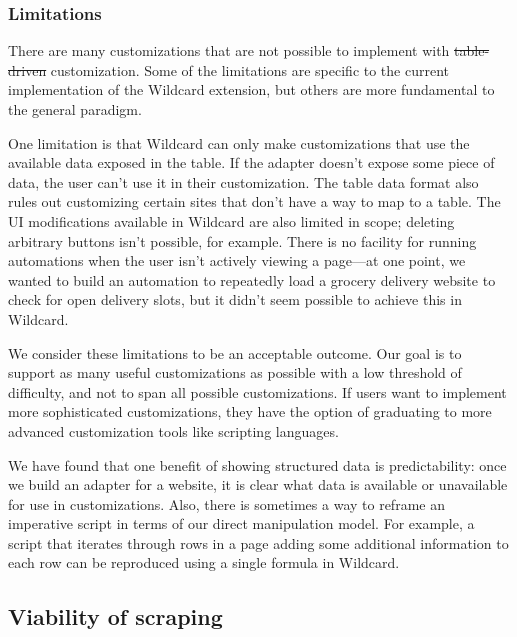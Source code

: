 \documentclass[sigplan,screen,10pt,anonymous,review]{acmart}
\providecommand{\DIFadd}[1]{{\protect\color{blue}\uwave{#1}}} %
\providecommand{\DIFdel}[1]{{\protect\color{red}\sout{#1}}}                      %
\providecommand{\DIFaddbegin}{} %
\providecommand{\DIFaddend}{} %
\providecommand{\DIFdelbegin}{} %
\providecommand{\DIFdelend}{} %
\begin{document}
\hypertarget{limitations}{%
\subsubsection{Limitations}\label{limitations}}

There are many customizations that are not possible to implement with
\DIFdelbegin \DIFdel{table-driven }\DIFdelend \DIFaddbegin \DIFadd{data-driven }\DIFaddend customization. Some of the limitations are specific to the
current implementation of the Wildcard extension, but others are more
fundamental to the general paradigm.

One limitation is that Wildcard can only make customizations that use
the available data exposed in the table. If the adapter doesn't expose
some piece of data, the user can't use it in their customization. The
table data format also rules out customizing certain sites that don't
have a way to map to a table. The UI modifications available in Wildcard
are also limited in scope; deleting arbitrary buttons isn't possible,
for example. There is no facility for running automations when the user
isn't actively viewing a page---at one point, we wanted to build an
automation to repeatedly load a grocery delivery website to check for
open delivery slots, but it didn't seem possible to achieve this in
Wildcard.

We consider these limitations to be an acceptable outcome. Our goal is
to support as many useful customizations as possible with a low
threshold of difficulty, and not to span all possible customizations. If
users want to implement more sophisticated customizations, they have the
option of graduating to more advanced customization tools like scripting
languages.

We have found that one benefit of showing structured data is
predictability: once we build an adapter for a website, it is clear what
data is available or unavailable for use in customizations. Also, there
is sometimes a way to reframe an imperative script in terms of our
direct manipulation model. For example, a script that iterates through
rows in a page adding some additional information to each row can be
reproduced using a single formula in Wildcard.

\hypertarget{viability-of-scraping}{%
\subsection{Viability of scraping}\label{viability-of-scraping}}
\end{document}
